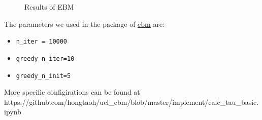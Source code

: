 \documentclass[
  letterpaper,
  DIV=11,
  numbers=noendperiod]{scrreprt}
\providecommand{\tightlist}{%
  \setlength{\itemsep}{0pt}\setlength{\parskip}{0pt}}\usepackage{longtable,booktabs,array}
\begin{document}
\begin{figure}


\caption{\label{fig-res-ebm-basic}Results of EBM}

\end{figure}%

The parameters we used in the package of
\href{https://github.com/ucl-pond/ebm}{ebm} are:

\begin{itemize}
\tightlist
\item
  \texttt{n\_iter\ =\ 10000}
\item
  \texttt{greedy\_n\_iter=10}
\item
  \texttt{greedy\_n\_init=5}
\end{itemize}

More specific configirations can be found at
https://github.com/hongtaoh/ucl\_ebm/blob/master/implement/calc\_tau\_basic.ipynb
\end{document}
